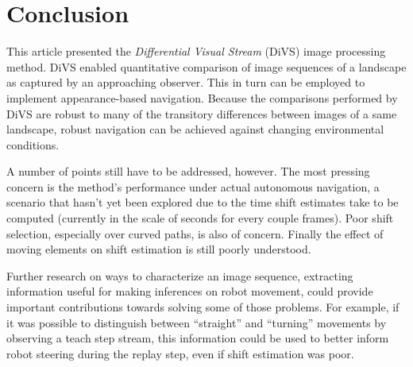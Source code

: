 \documentclass[twocolumn, 9pt,fleqn]{jsproceedings}
\begin{document}
\section{Conclusion}

This article presented the \textit{Differential Visual Stream} (DiVS) image processing method. DiVS enabled quantitative comparison of image sequences of a landscape as captured by an approaching observer. This in turn can be employed to implement appearance-based navigation. Because the comparisons performed by DiVS are robust to many of the transitory differences between images of a same landscape, robust navigation can be achieved against changing environmental conditions.

A number of points still have to be addressed, however. The most pressing concern is the method's performance under actual autonomous navigation, a scenario that hasn't yet been explored due to the time shift estimates take to be computed (currently in the scale of seconds for every couple frames). Poor shift selection, especially over curved paths, is also of concern. Finally the effect of moving elements on shift estimation is still poorly understood.

Further research on ways to characterize an image sequence, extracting information useful for making inferences on robot movement, could provide important contributions towards solving some of those problems. For example, if it was possible to distinguish between ``straight'' and ``turning'' movements by observing a teach step stream, this information could be used to better inform robot steering during the replay step, even if shift estimation was poor.

\footnotesize




\normalsize
\end{document}
